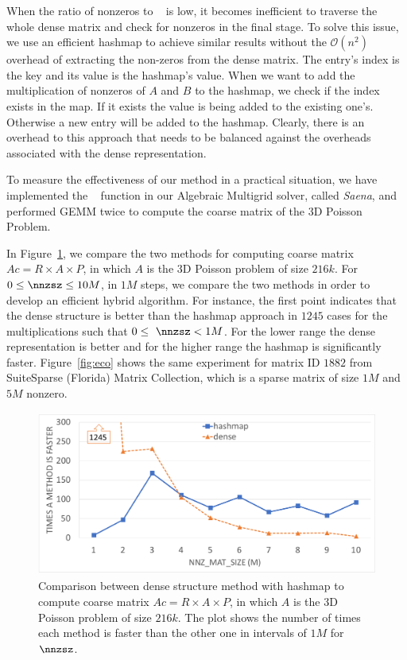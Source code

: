 When the ratio of nonzeros to \nnzsz~ is low, it becomes inefficient to traverse the whole dense matrix and check for nonzeros in the final stage. To solve this issue, we use an efficient hashmap to achieve similar results without the $\mathcal{O}(n^2)$ overhead of extracting the non-zeros from the dense matrix. The entry's index is the key and its value is the hashmap's value. When we want to add the multiplication of nonzeros of $A$ and $B$ to the hashmap, we check if the index exists in the map. If it exists the value is being added to the existing one's. Otherwise a new entry will be added to the hashmap. Clearly, there is an overhead to this approach that needs to be balanced against the overheads associated with the dense representation. 

To measure the effectiveness of our method in a practical situation, we have implemented the \recmm~ function in our Algebraic Multigrid solver, called \textit{Saena}, and performed \textsc{GEMM} twice to compute the coarse matrix of the 3D Poisson Problem.

In Figure~\ref{fig:lap60}, we compare the two methods for computing coarse matrix $Ac = R \times A \times P$, in which $A$ is the 3D Poisson problem of size $216k$. For $0 \leq \nnzsz \leq 10M$, in $1M$ steps, we compare the two methods in order to develop an efficient hybrid algorithm. For instance, the first point indicates that the dense structure is better than the hashmap approach in $1245$ cases for the multiplications such that $0 \le\ \nnzsz < 1M$. For the lower range the dense representation is better and for the higher range the hashmap is significantly faster. Figure~\ref{fig:eco} shows the same experiment for matrix ID $1882$ from SuiteSparse (Florida) Matrix Collection, which is a sparse matrix of size $1M$ and $5M$ nonzero.

\begin{figure}[p]
 \centering
 \includegraphics[width=11.8cm,height=5.4cm]{./figures/lap60_range.pdf}
 \caption{Comparison between dense structure method with hashmap to compute coarse matrix $Ac = R \times A \times P$, in which $A$ is the 3D Poisson problem of size $216k$. The plot shows the number of times each method is faster than the other one in intervals of $1M$ for $\nnzsz$.}
 \label{fig:lap60}
\end{figure}

